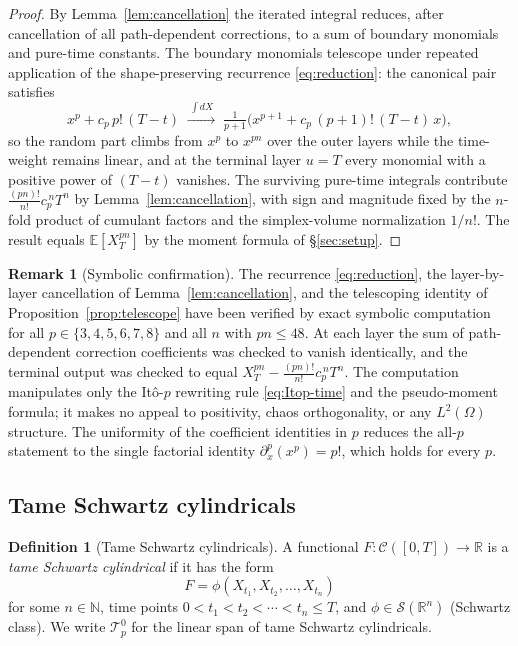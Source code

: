 \documentclass[11pt,reqno]{amsart}
\theoremstyle{plain}
\theoremstyle{definition}
\newtheorem{definition}[theorem]{Definition}
\newtheorem{remark}[theorem]{Remark}
\newcommand{\E}{\mathbb{E}}
\newcommand{\R}{\mathbb{R}}
\newcommand{\N}{\mathbb{N}}
\newcommand{\Schw}{\mathcal{S}}
\begin{document}
\begin{proof}
By Lemma~\ref{lem:cancellation} the iterated integral reduces, after cancellation of all path-dependent corrections, to a sum of boundary monomials and pure-time constants. The boundary monomials telescope under repeated application of the shape-preserving recurrence \eqref{eq:reduction}: the canonical pair satisfies
\[
x^{p} + c_p\,p!\,(T-t) \;\xrightarrow{\ \int dX\ }\; \tfrac{1}{p+1}\bigl(x^{p+1} + c_p\,(p+1)!\,(T-t)\,x\bigr),
\]
so the random part climbs from $x^{p}$ to $x^{pn}$ over the outer layers while the time-weight remains linear, and at the terminal layer $u=T$ every monomial with a positive power of $(T-t)$ vanishes. The surviving pure-time integrals contribute $\tfrac{(pn)!}{n!}c_p^{\,n}T^{n}$ by Lemma~\ref{lem:cancellation}, with sign and magnitude fixed by the $n$-fold product of cumulant factors and the simplex-volume normalization $1/n!$. The result equals $\E[X_T^{pn}]$ by the moment formula of \S\ref{sec:setup}.
\end{proof}

\begin{remark}[Symbolic confirmation]
\label{rem:symbolic}
The recurrence \eqref{eq:reduction}, the layer-by-layer cancellation of Lemma~\ref{lem:cancellation}, and the telescoping identity of Proposition~\ref{prop:telescope} have been verified by exact symbolic computation for all $p \in \{3,4,5,6,7,8\}$ and all $n$ with $pn \leq 48$. At each layer the sum of path-dependent correction coefficients was checked to vanish identically, and the terminal output was checked to equal $X_T^{pn} - \tfrac{(pn)!}{n!}c_p^{\,n}T^{n}$. The computation manipulates only the Itô-$p$ rewriting rule \eqref{eq:Itop-time} and the pseudo-moment formula; it makes no appeal to positivity, chaos orthogonality, or any $L^2(\Omega)$ structure. The uniformity of the coefficient identities in $p$ reduces the all-$p$ statement to the single factorial identity $\partial_x^p(x^p)=p!$, which holds for every $p$.
\end{remark}

\subsection{Tame Schwartz cylindricals}

\begin{definition}[Tame Schwartz cylindricals]
\label{def:tame}
A functional $F: \mathcal{C}([0,T]) \to \R$ is a \emph{tame Schwartz cylindrical} if it has the form
\begin{equation}
\label{eq:tame}
F = \phi(X_{t_1}, X_{t_2}, \ldots, X_{t_n})
\end{equation}
for some $n \in \N$, time points $0 < t_1 < t_2 < \cdots < t_n \leq T$, and $\phi \in \Schw(\R^n)$ (Schwartz class). We write $\mathcal{T}_p^0$ for the linear span of tame Schwartz cylindricals.
\end{definition}
\end{document}
